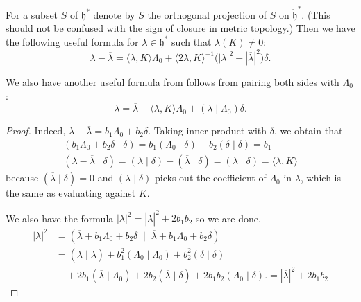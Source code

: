 \documentclass[12pt]{article}
\begin{document}
\begin{lemma}\label{lem:affine-formulas}
For a subset $S$ of $\mathfrak{h}^*$ denote by $\overline{S}$ the orthogonal projection of $S$ on $\mathring{\mathfrak{h}}^*$.
(This should not be confused with the sign of closure in metric topology.)
Then we have the following useful formula for $\lambda \in \mathfrak{h}^*$ such that $\lambda(K)\neq 0$:
\begin{equation}
\lambda - \overline{\lambda}
= \langle \lambda, K \rangle \Lambda_0
+ \langle 2\lambda, K \rangle^{-1}\big(|\lambda|^2 - |\overline{\lambda}|^2\big)\delta.
\tag{6.2.6}
\end{equation}

We also have another useful formula from follows from pairing both sides with $\Lambda_0$:
\begin{equation}
\lambda = \overline{\lambda} + \langle \lambda, K \rangle \Lambda_0 + (\lambda \mid \Lambda_0)\delta.
\end{equation}
\end{lemma}

\begin{proof}
Indeed, $\lambda - \overline{\lambda} = b_1 \Lambda_0 + b_2\delta$.  
Taking inner product with $\delta$, we obtain that \begin{align*}
    (b_1 \Lambda_0 + b_2 \delta \mid \delta) = b_1 (\Lambda_0 \mid \delta) + b_2 (\delta \mid \delta) = b_1 \\
    (\lambda - \overline{\lambda} \mid \delta) = (\lambda \mid \delta) - (\overline{\lambda} \mid \delta) = (\lambda \mid \delta) = \langle \lambda, K \rangle
\end{align*} because $(\overline{\lambda} \mid \delta) = 0$ and $(\lambda \mid \delta)$ picks out the coefficient of $\Lambda_0$ in $\lambda$, which is the same as evaluating against $K$.

We also have the formula $|\lambda|^2 = |\overline{\lambda}|^2 + 2b_1 b_2$ so we are done.
\begin{align*}
|\lambda|^2 
&= (\overline{\lambda} + b_1 \Lambda_0 + b_2 \delta \;\mid\; \overline{\lambda} + b_1 \Lambda_0 + b_2 \delta) \\[6pt]
&= (\overline{\lambda}\mid \overline{\lambda})
   + b_1^2 (\Lambda_0 \mid \Lambda_0)
   + b_2^2 (\delta \mid \delta) \\[4pt]
&\quad + 2b_1 (\overline{\lambda}\mid \Lambda_0)
   + 2b_2 (\overline{\lambda}\mid \delta)
   + 2b_1 b_2 (\Lambda_0\mid \delta).
   = |\overline{\lambda}|^2 + 2b_1 b_2
\end{align*}
\end{proof}
\end{document}
